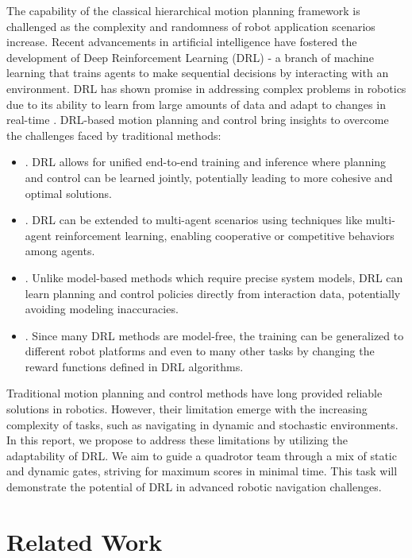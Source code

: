 \documentclass[letterpaper,journal,twoside]{IEEEtran}
\begin{document}
The capability of the 
classical hierarchical motion planning framework is 
challenged 
as the complexity and randomness of robot application 
scenarios increase. 
Recent advancements in artificial intelligence have fostered 
the development of Deep Reinforcement Learning (DRL) - a branch 
of machine learning that trains agents to make sequential 
decisions by interacting with an environment. DRL has shown 
promise in addressing complex problems in robotics 
due to its ability to learn from large 
amounts of data and adapt to changes in real-time
\cite{lee2020learning,hwangbo2017control,gu2017deep}.
DRL-based motion planning and control bring insights to 
overcome the challenges faced by traditional methods: 
\begin{itemize}
  \item {}. DRL allows for unified end-to-end 
  training and inference where planning and control can be 
  learned 
  jointly, potentially leading to more cohesive and optimal 
  solutions.
  \item {}.  DRL can be 
  extended to multi-agent scenarios using techniques like 
  multi-agent reinforcement learning, enabling cooperative or 
  competitive behaviors among agents.
  \item {}. Unlike model-based methods which 
  require precise system models, DRL can learn planning and  
  control policies directly from interaction data, potentially  
  avoiding modeling inaccuracies.
  \item {}. Since many DRL methods are 
  model-free, the training can be generalized to different 
  robot platforms and even to many other tasks by changing 
  the reward functions defined in DRL algorithms.
\end{itemize}


Traditional motion planning and control methods have long 
provided 
reliable solutions in robotics. 
However, their limitation emerge with the increasing complexity of tasks, 
such as 
navigating in dynamic and stochastic environments.
In this report, we propose to address these limitations
by utilizing the 
adaptability of DRL.  
We aim to guide a quadrotor team through a mix of static 
and dynamic gates, striving for maximum scores in minimal time. 
This task will demonstrate the potential of DRL in advanced 
robotic navigation challenges.



\section{Related Work}
\end{document}
